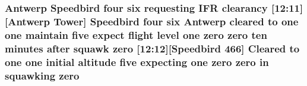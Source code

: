 \subsubsection[{\texorpdfstring{zero}{zero}}]{\setlength{\rightskip}{0pt plus 5cm}Antwerp Speedbird four {\bf six} requesting I\+FR clearancy \mbox{[}12\+:11\mbox{]}\mbox{[}Antwerp {\bf Tower}\mbox{]} Speedbird four {\bf six} Antwerp cleared to {\bf one} {\bf one} maintain five expect flight level {\bf one} zero zero {\bf ten} minutes after squawk zero \mbox{[}12\+:12\mbox{]}\mbox{[}Speedbird 466\mbox{]} Cleared to {\bf one} {\bf one} initial altitude five expecting {\bf one} zero zero in {\bf squawking} zero}\hypertarget{happyDay5ExpectedATC_8txt_a1cdb3e947394a8f9b50cff125d86fb29}{}\label{happyDay5ExpectedATC_8txt_a1cdb3e947394a8f9b50cff125d86fb29}
